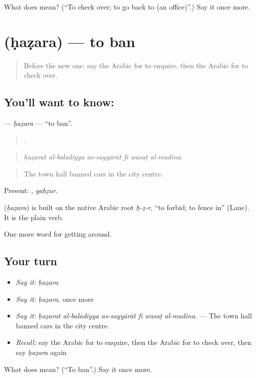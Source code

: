 \begin{tcolorbox}[breakable,colback=teal!4,colframe=teal!35!black,title={Before you move on}]
What does  mean? (\textquotedblleft{}To check over; to go back to (an office)\textquotedblright{}.) Say it once more.
\end{tcolorbox}
\section[\texorpdfstring{\ar{حظر} (ḥaẓara)}{حظر (ḥaẓara)}]{ (ḥaẓara) — to ban}

\label{lesson:AR-C451-hazara}



\begin{quote}
Before the new one: say the Arabic for to enquire, then the Arabic for to check over.
\end{quote}

\subsection*{You'll want to know: }
\textbf{} — \emph{ḥaẓara} — \textquotedblleft{}to ban\textquotedblright{}.

\begin{quote}
     .
\end{quote}

\begin{quote}
\emph{ḥaẓarat al-baladiyya as-sayyārāt fī wasaṭ al-madīna.}
\end{quote}

\begin{quote}
The town hall banned cars in the city centre.
\end{quote}

Present: , \emph{yaḥẓur}.

\begin{cousinweb}
\textbf{} (\emph{ḥaẓara}) is built on the native Arabic root \emph{ḥ-ẓ-r}, \textquotedblleft{}to forbid; to fence in\textquotedblright{} (Lane). It is the plain verb.
\end{cousinweb}

\begin{grammarlens}[title={What you've built}]
One more word for getting around.
\end{grammarlens}

\subsection*{Your turn}
\begin{itemize}
\raggedright
  \item \emph{Say it:} \emph{ḥaẓara}
  \item \emph{Say it:} \emph{ḥaẓara}, once more
  \item \emph{Say it:} \emph{ḥaẓarat al-baladiyya as-sayyārāt fī wasaṭ al-madīna.} — The town hall banned cars in the city centre.
  \item \emph{Recall:} say the Arabic for to enquire, then the Arabic for to check over, then say \emph{ḥaẓara} again
\end{itemize}

\begin{tcolorbox}[breakable,colback=teal!4,colframe=teal!35!black,title={Before you move on}]
What does  mean? (\textquotedblleft{}To ban\textquotedblright{}.) Say it once more.
\end{tcolorbox}
